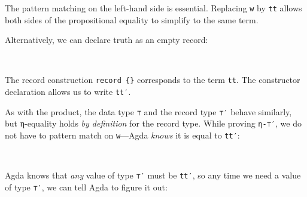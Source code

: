 The pattern matching on the left-hand side is essential. Replacing
\texttt{w} by \texttt{tt} allows both sides of the propositional
equality to simplify to the same term.

Alternatively, we can declare truth as an empty record:

\begin{fence}
\begin{code}%
\>[0]\AgdaSpace{}%
\AgdaSpace{}%
\AgdaSymbol{:}\AgdaSpace{}%
\AgdaSpace{}%
\<%
\\
\>[0][@{}l@{\AgdaIndent{0}}]%
\>[2]\AgdaSpace{}%
\<%
\end{code}
\end{fence}

The record construction \texttt{record\ \{\}} corresponds to the term
\texttt{tt}. The constructor declaration allows us to write
\texttt{tt′}.

As with the product, the data type \texttt{⊤} and the record type
\texttt{⊤′} behave similarly, but η-equality holds \emph{by definition}
for the record type. While proving \texttt{η-⊤′}, we do not have to
pattern match on \texttt{w}---Agda \emph{knows} it is equal to
\texttt{tt′}:

\begin{fence}
\begin{code}%
\>[0]\AgdaSpace{}%
\AgdaSymbol{:}\AgdaSpace{}%
\AgdaSpace{}%
\AgdaSymbol{(}\AgdaSpace{}%
\AgdaSymbol{:}\AgdaSpace{}%
\AgdaSymbol{)}\AgdaSpace{}%
\AgdaSpace{}%
\AgdaSpace{}%
\AgdaSpace{}%
\<%
\\
\>[0]\AgdaSpace{}%
\AgdaSpace{}%
\AgdaSymbol{=}\AgdaSpace{}%
\<%
\end{code}
\end{fence}

Agda knows that \emph{any} value of type \texttt{⊤′} must be
\texttt{tt′}, so any time we need a value of type \texttt{⊤′}, we can
tell Agda to figure it out:

\begin{fence}
\begin{code}%
\>[0]\AgdaSpace{}%
\AgdaSymbol{:}\AgdaSpace{}%
\<%
\\
\>[0]\AgdaSpace{}%
\AgdaSymbol{=}\AgdaSpace{}%
\AgdaSymbol{\AgdaUnderscore{}}\<%
\end{code}
\end{fence}

